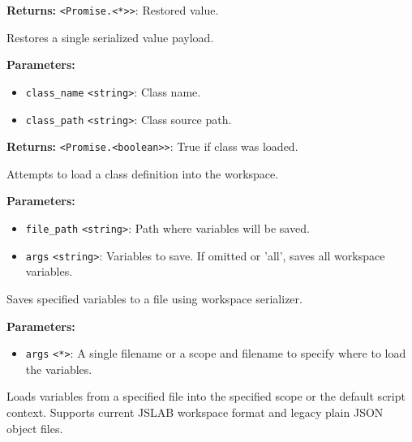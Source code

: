 \documentclass[12pt,a4paper]{article}
\begin{document}
\noindent \textbf{Returns:} \texttt{<Promise.<*>>}: Restored value.

\noindent Restores a single serialized value payload.

\vspace{5mm}
\noindent {}


\noindent \textbf{Parameters:}
\begin{itemize}
  \item \texttt{class\_name} \texttt{<string>}: Class name.
  \item \texttt{class\_path} \texttt{<string>}: Class source path.
\end{itemize}

\noindent \textbf{Returns:} \texttt{<Promise.<boolean>>}: True if class was loaded.

\noindent Attempts to load a class definition into the workspace.

\vspace{5mm}
\noindent {}


\noindent \textbf{Parameters:}
\begin{itemize}
  \item \texttt{file\_path} \texttt{<string>}: Path where variables will be saved.
  \item \texttt{args} \texttt{<string>}: Variables to save. If omitted or 'all', saves all workspace variables.
\end{itemize}

\noindent Saves specified variables to a file using workspace serializer.

\vspace{5mm}
\noindent {}


\noindent \textbf{Parameters:}
\begin{itemize}
  \item \texttt{args} \texttt{<*>}: A single filename or a scope and filename to specify where to load the variables.
\end{itemize}

\noindent Loads variables from a specified file into the specified scope or the default script context.
Supports current JSLAB workspace format and legacy plain JSON object files.
\end{document}
